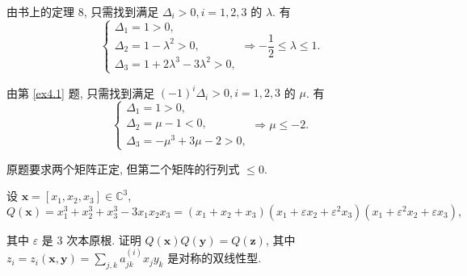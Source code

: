 \documentclass[color=black,device=normal,lang=cn,mode=geye]{elegantnote}
\begin{document}
\begin{solution}
    由书上的定理 8, 只需找到满足 $\Delta_i>0,i=1,2,3$ 的 $\lambda$. 有
    \[\begin{cases}
        \Delta_1=1>0, \\
        \Delta_2=1-\lambda^2>0, \\
        \Delta_3=1+2\lambda^3-3\lambda^2>0,
    \end{cases}\Rightarrow-\dfrac{1}{2}\leq\lambda\leq1.\]

    由第 \ref{ex4.1} 题, 只需找到满足 $(-1)^i\Delta_i>0,i=1,2,3$ 的 $\mu$. 有
    \[\begin{cases}
        \Delta_1=1>0, \\
        \Delta_2=\mu-1<0, \\
        \Delta_3=-\mu^3+3\mu-2>0,
    \end{cases}\Rightarrow\mu\leq-2.\]
\end{solution}
\begin{note}
    原题要求两个矩阵正定, 但第二个矩阵的行列式 $\leq0$.
\end{note}
\begin{exercise}%
    设 $\boldsymbol{x}=[x_1,x_2,x_3]\in\mathbb{C}^3$,
    \[Q(\boldsymbol{x})=x_1^3+x_2^3+x_3^3-3x_1x_2x_3=(x_1+x_2+x_3)(x_1+\varepsilon x_2+\varepsilon^2x_3)(x_1+\varepsilon^2x_2+\varepsilon x_3),\]

    其中 $\varepsilon$ 是 $3$ 次本原根. 证明 $Q(\boldsymbol{x})Q(\boldsymbol{y})=Q(\boldsymbol{z})$, 其中 $z_i=z_i(\boldsymbol{x},\boldsymbol{y})=\sum\limits_{j,k}a^{(i)}_{jk}x_jy_k$ 是对称的双线性型.
\end{exercise}
\end{document}
